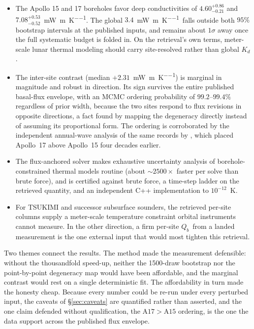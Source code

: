 \documentclass[11pt,a4paper,oneside]{report}
\newcommand{\Kd}{\ensuremath{K_d}}
\newcommand{\Qb}{\ensuremath{Q_b}}
\newcommand{\mWmK}{\si{\milli\watt\per\meter\per\kelvin}}
\begin{document}
\begin{itemize}
  \item The Apollo 15 and 17 boreholes favor deep conductivities of
    $4.60^{+0.86}_{-0.21}$ and $7.08^{+0.53}_{-0.52}$~\mWmK. The
    global $3.4$~\mWmK\ falls outside both $95\%$ bootstrap intervals
    at the published inputs, and remains about $1\sigma$ away once
    the full systematic budget is folded in. On the retrieval's own
    terms, meter-scale lunar thermal modeling should carry
    site-resolved rather than global \Kd.
  \item The inter-site contrast (median $+2.31$~\mWmK) is marginal in
    magnitude and robust in direction. Its sign survives the entire
    published basal-flux envelope, with an MCMC ordering probability
    of $99.2$--$99.4\%$ regardless of prior width, because the two
    sites respond to flux revisions in opposite directions, a fact
    found by mapping the degeneracy directly instead of assuming its
    proportional form. The ordering is corroborated by the
    independent annual-wave analysis of the same records by
    \citet{langseth1976}, which placed Apollo~17 above Apollo~15 four
    decades earlier.
  \item The flux-anchored solver makes exhaustive uncertainty
    analysis of borehole-constrained thermal models routine
    (about ${\sim}2500\times$ faster per solve than brute force), and
    is certified against brute force, a time-step ladder on the
    retrieved quantity, and an independent C++ implementation to
    $10^{-12}$~K.
  \item For TSUKIMI and successor subsurface sounders, the retrieved
    per-site columns supply a meter-scale temperature constraint
    orbital instruments cannot measure. In the other direction, a
    firm per-site \Qb\ from a landed measurement is the one external
    input that would most tighten this retrieval.
\end{itemize}

Two themes connect the results. The method made the measurement
defensible: without the thousandfold speed-up, neither the 1500-draw
bootstrap nor the point-by-point degeneracy map would have been
affordable, and the marginal contrast would rest on a single
deterministic fit. The affordability in turn made the honesty cheap.
Because every number could be re-run under every perturbed input, the
caveats of \S\ref{sec:caveats} are quantified rather than asserted,
and the one claim defended without qualification, the
$\mathrm{A17}>\mathrm{A15}$ ordering, is the one the data support
across the published flux envelope.
\end{document}
